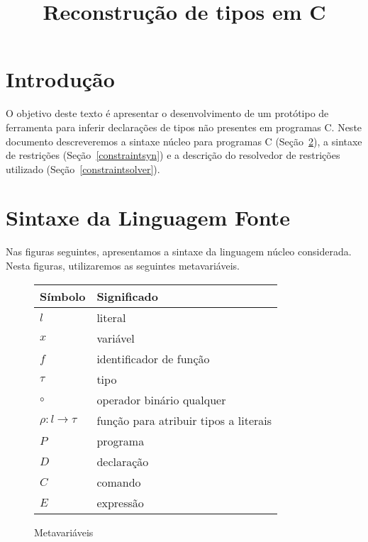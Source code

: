 \documentclass[a4paper,8pt]{article}
\begin{document}
     \title{Reconstrução de tipos em C}

     \maketitle
     

     \section{Introdução}\label{intro}

     O objetivo deste texto é apresentar o desenvolvimento de um
     protótipo de ferramenta para inferir declarações de tipos não
     presentes em programas C. Neste documento descreveremos
     a sintaxe núcleo para programas C (Seção~\ref{corecsyn}), a
     sintaxe de restrições (Seção~\ref{constraintsyn}) e a descrição
     do resolvedor de restrições utilizado
     (Seção~\ref{constraintsolver}).

     \section{Sintaxe da Linguagem Fonte}\label{corecsyn}

     Nas figuras seguintes, apresentamos a sintaxe da linguagem núcleo
     considerada. Nesta figuras, utilizaremos as seguintes metavariáveis.

     \begin{figure}[h]
     \begin{tabular}{|l|l|}
       \hline
       Símbolo & Significado \\ \hline
		$l$ & {literal} \\
		$x$ & {variável}\\
		$f$  & {identificador de função} \\
		$\tau$ & {tipo}\\
		$\circ$ & {operador binário qualquer}\\
                $\rho : l \to \tau$ & {função para atribuir tipos a
                                      literais}\\
                $P$ & {programa} \\
                $D$ & {declaração} \\
                $C$ & {comando} \\
                $E$ & {expressão}\\
		\hline
		\end{tabular}
           \centering
           \caption{Metavariáveis}
           \label{figmetavar}
       \end{figure}
\end{document}
